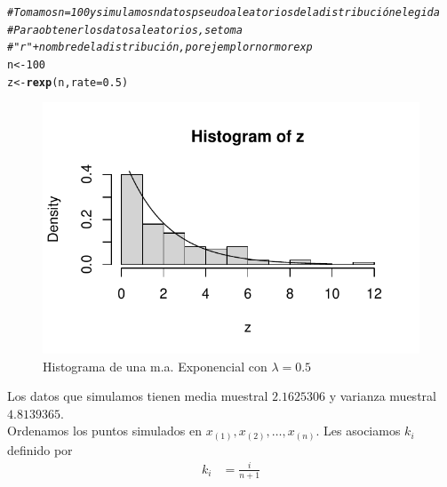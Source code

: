 \documentclass[10pt]{article}\usepackage[]{graphicx}\usepackage[]{xcolor}
\makeatletter
\def\maxwidth{ %
  \ifdim\Gin@nat@width>\linewidth
    \linewidth
  \else
    \Gin@nat@width
  \fi
}
\newcommand{\hlnum}[1]{\textcolor[rgb]{0.686,0.059,0.569}{#1}}%
\newcommand{\hlcom}[1]{\textcolor[rgb]{0.678,0.584,0.686}{\textit{#1}}}%
\newcommand{\hlstd}[1]{\textcolor[rgb]{0.345,0.345,0.345}{#1}}%
\newcommand{\hlkwb}[1]{\textcolor[rgb]{0.69,0.353,0.396}{#1}}%
\newcommand{\hlkwc}[1]{\textcolor[rgb]{0.333,0.667,0.333}{#1}}%
\newcommand{\hlkwd}[1]{\textcolor[rgb]{0.737,0.353,0.396}{\textbf{#1}}}%
\newenvironment{kframe}{%
 \def\at@end@of@kframe{}%
 \ifinner\ifhmode%
  \def\at@end@of@kframe{\end{minipage}}%
  \begin{minipage}{\columnwidth}%
 \fi\fi%
 \def\FrameCommand##1{\hskip\@totalleftmargin \hskip-\fboxsep
 \colorbox{shadecolor}{##1}\hskip-\fboxsep
     \hskip-\linewidth \hskip-\@totalleftmargin \hskip\columnwidth}%
 \MakeFramed {\advance\hsize-\width
   \@totalleftmargin\z@ \linewidth\hsize
   \@setminipage}}%
 {\par\unskip\endMakeFramed%
 \at@end@of@kframe}
\newenvironment{knitrout}{}{} %
\makeatother
\begin{document}
\begin{knitrout}
\color{fgcolor}\begin{kframe}
\begin{alltt}
\hlcom{# Tomamos n=100 y simulamos n datos pseudoaleatorios de la distribución elegida}
\hlcom{# Para obtener los datos aleatorios, se toma}
\hlcom{# "r"+nombre de la distribución, por ejemplo rnorm o rexp}
\hlstd{n} \hlkwb{<-} \hlnum{100}
\hlstd{z} \hlkwb{<-} \hlkwd{rexp}\hlstd{(n,}\hlkwc{rate} \hlstd{=} \hlnum{0.5}\hlstd{)}
\end{alltt}
\end{kframe}
\end{knitrout}
\begin{knitrout}
\color{fgcolor}\begin{figure}[hb!]

{\centering \includegraphics[width=\maxwidth]{figure/histograma-1} 

}

\caption[Histograma de una m.a]{Histograma de una m.a. Exponencial con $\lambda=0.5$}\label{fig:histograma}
\end{figure}

\end{knitrout}
Los datos que simulamos tienen media muestral $2.1625306$ y varianza muestral $4.8139365$.\\
Ordenamos los puntos simulados en $x_{(1)},x_{(2)}, \ldots, x_{(n)}$. Les asociamos $k_i$ definido por
\begin{align}
k_i &= \frac{i}{n+1}
\end{align}
\end{document}
